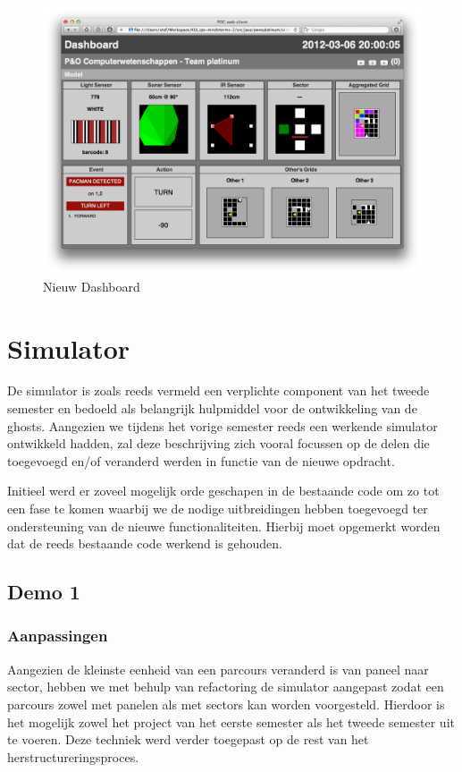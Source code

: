 \documentclass[12pt,a4paper]{report}
\begin{document}
\begin{figure}[htbp]
  \centering
  \includegraphics[width=155mm]{resources/dashboard.png}
  \caption{Nieuw Dashboard}
  \label{fig:dashboard}
\end{figure}

\chapter{Simulator}

De simulator is zoals reeds vermeld een verplichte component van het tweede semester en bedoeld als belangrijk hulpmiddel voor de ontwikkeling van de ghosts. Aangezien we tijdens het vorige semester reeds een werkende simulator ontwikkeld hadden, zal deze beschrijving zich vooral focussen op de delen die toegevoegd en/of veranderd werden in functie van de nieuwe opdracht.

Initieel werd er zoveel mogelijk orde geschapen in de bestaande code om zo tot een fase te komen waarbij we de nodige uitbreidingen hebben toegevoegd ter ondersteuning van de nieuwe functionaliteiten. Hierbij moet opgemerkt worden dat de reeds bestaande code werkend is gehouden.

\section{Demo 1}

\subsection{Aanpassingen}

Aangezien de kleinste eenheid van een parcours veranderd is van paneel naar sector, hebben we met behulp van refactoring de simulator aangepast zodat een parcours zowel met panelen als met sectors kan worden voorgesteld. Hierdoor is het mogelijk zowel het project van het eerste semester als het tweede semester uit te voeren. Deze techniek werd verder toegepast op de rest van het herstructureringsproces. 
\end{document}
